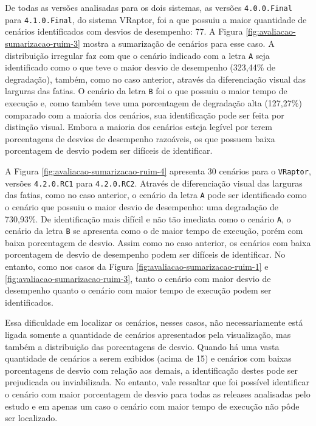 De todas as versões analisadas para os dois sistemas, as versões \texttt{4.0.0.Final} para \texttt{4.1.0.Final}, do sistema VRaptor, foi a que possuiu a maior quantidade de cenários identificados com desvios de desempenho: 77. A Figura \ref{fig:avaliacao-sumarizacao-ruim-3} mostra a sumarização de cenários para esse caso. A distribuição irregular faz com que o cenário indicado com a letra \texttt{A} seja identificado como o que teve o maior desvio de desempenho (323,44\% de degradação), também, como no caso anterior, através da diferenciação visual das larguras das fatias. O cenário da letra \texttt{B} foi o que possuiu o maior tempo de execução e, como também teve uma porcentagem de degradação alta (127,27\%) comparado com a maioria dos cenários, sua identificação pode ser feita por distinção visual. Embora a maioria dos cenários esteja legível por terem porcentagens de desvios de desempenho razoáveis, os que possuem baixa porcentagem de desvio podem ser difíceis de identificar.

A Figura \ref{fig:avaliacao-sumarizacao-ruim-4} apresenta 30 cenários para o \texttt{VRaptor}, versões \texttt{4.2.0.RC1} para \texttt{4.2.0.RC2}. Através de diferenciação visual das larguras das fatias, como no caso anterior, o cenário da letra \texttt{A} pode ser identificado como o cenário que possuiu o maior desvio de desempenho: uma degradação de 730,93\%. De identificação mais difícil e não tão imediata como o cenário \texttt{A}, o cenário da letra \texttt{B} se apresenta como o de maior tempo de execução, porém com baixa porcentagem de desvio. Assim como no caso anterior, os cenários com baixa porcentagem de desvio de desempenho podem ser difíceis de identificar. No entanto, como nos casos da Figura \ref{fig:avaliacao-sumarizacao-ruim-1} e \ref{fig:avaliacao-sumarizacao-ruim-3}, tanto o cenário com maior desvio de desempenho quanto o cenário com maior tempo de execução podem ser identificados.

Essa dificuldade em localizar os cenários, nesses casos, não necessariamente está ligada somente a quantidade de cenários apresentados pela visualização, mas também a distribuição das porcentagens de desvio. Quando há uma vasta quantidade de cenários a serem exibidos (acima de 15) e cenários com baixas porcentagens de desvio com relação aos demais, a identificação destes pode ser prejudicada ou inviabilizada. No entanto, vale ressaltar que foi possível identificar o cenário com maior porcentagem de desvio para todas as releases analisadas pelo estudo e em apenas um caso o cenário com maior tempo de execução não pôde ser localizado.

